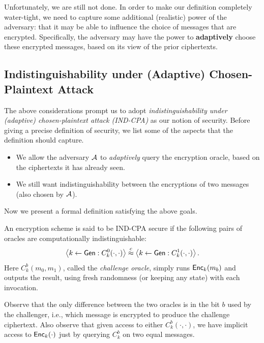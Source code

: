 \documentclass[11pt]{article}
\begin{document}
Unfortunately, we are still not done.  In order to make our definition
completely water-tight, we need to capture some additional (realistic)
power of the adversary: that it may be able to influence the choice of
messages that are encrypted.  Specifically, the adversary may have the
power to \textbf{adaptively} choose these encrypted messages, based on
its view of the prior ciphertexts. 

\subsection{Indistinguishability under (Adaptive) Chosen-Plaintext Attack}
\label{sec:indist-under-chos}

The above considerations prompt us to adopt
\textit{indistinguishability under (adaptive) chosen-plaintext attack
  (IND-CPA)} as our notion of security.  Before giving a precise
definition of security, we list some of the aspects that the
definition should capture.

\begin{itemize}
\item We allow the adversary $\mathcal{A}$ to \emph{adaptively} query the
  encryption oracle, based on the ciphertexts it has already seen.
\item We still want indistinguishability between the encryptions of
  two messages (also chosen by $\mathcal{A}$).
\end{itemize}

Now we present a formal definition satisfying the above goals.

\begin{definition}
  \label{def:ind-cpa}
  An encryption scheme is said to be IND-CPA secure if the following
  pairs of oracles are computationally indistinguishable:
  \[ \left\langle k \gets \mathsf{Gen} : C^0_k(\cdot, \cdot) \right\rangle
  \stackrel{c}{\approx} \left\langle k \gets \mathsf{Gen} : C^1_k(\cdot, \cdot)
  \right\rangle. \] Here $C^{b}_{k}(m_{0}, m_{1})$, called the
  \emph{challenge oracle}, simply runs $\mathsf{Enc}_{k}(m_{b})$ and
  outputs the result, using fresh randomness (or keeping any state)
  with each invocation.
\end{definition}

Observe that the only difference between the two oracles is in the bit
$b$ used by the challenger, i.e., which message is encrypted to
produce the challenge ciphertext.  Also observe that given access to
either $C^{b}_{k}(\cdot,\cdot)$, we have implicit access to
$\mathsf{Enc}_{k}(\cdot)$ just by querying $C^{b}_{k}$ on two equal
messages.
\end{document}
